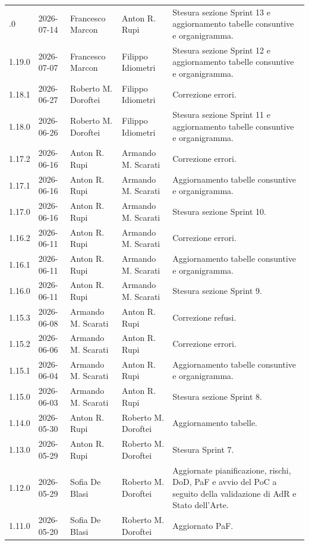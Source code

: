 \begin{longtable}{>{\ttfamily\small}l l l l >{\raggedright\arraybackslash}p{4cm}}
    \bottomrule
    \endlastfoot
    1.20.0 & 2026-07-14 & Francesco Marcon & Anton R. Rupi & Stesura sezione Sprint 13 e aggiornamento tabelle consuntive e organigramma. \\
    1.19.0 & 2026-07-07 & Francesco Marcon & Filippo Idiometri & Stesura sezione Sprint 12 e aggiornamento tabelle consuntive e organigramma. \\
    1.18.1 & 2026-06-27 & Roberto M. Doroftei & Filippo Idiometri  & Correzione errori. \\
    1.18.0 & 2026-06-26 & Roberto M. Doroftei & Filippo Idiometri  & Stesura sezione Sprint 11 e aggiornamento tabelle consuntive e organigramma. \\
    1.17.2 & 2026-06-16 & Anton R. Rupi & Armando M. Scarati & Correzione errori. \\
    1.17.1 & 2026-06-16 & Anton R. Rupi & Armando M. Scarati & Aggiornamento tabelle consuntive e organigramma. \\
    1.17.0 & 2026-06-16 & Anton R. Rupi & Armando M. Scarati  & Stesura sezione Sprint 10. \\
    1.16.2 & 2026-06-11 & Anton R. Rupi & Armando M. Scarati & Correzione errori. \\
    1.16.1 & 2026-06-11 & Anton R. Rupi & Armando M. Scarati & Aggiornamento tabelle consuntive e organigramma. \\
    1.16.0 & 2026-06-11 & Anton R. Rupi & Armando M. Scarati  & Stesura sezione Sprint 9. \\
    1.15.3 & 2026-06-08 & Armando M. Scarati & Anton R. Rupi & Correzione refusi. \\
    1.15.2 & 2026-06-06 & Armando M. Scarati & Anton R. Rupi & Correzione errori. \\
    1.15.1 & 2026-06-04 & Armando M. Scarati & Anton R. Rupi & Aggiornamento tabelle consuntive e organigramma. \\
    1.15.0 & 2026-06-03 & Armando M. Scarati & Anton R. Rupi & Stesura sezione Sprint 8. \\
    1.14.0 & 2026-05-30 & Anton R. Rupi & Roberto M. Doroftei & Aggiornamento tabelle. \\
    1.13.0 & 2026-05-29 & Anton R. Rupi & Roberto M. Doroftei & Stesura Sprint 7. \\
    1.12.0 & 2026-05-29 & Sofia De Blasi & Roberto M. Doroftei & Aggiornate pianificazione, rischi, DoD, PaF e avvio del PoC a seguito della validazione di AdR e Stato dell'Arte. \\
	1.11.0 & 2026-05-20 & Sofia De Blasi & Roberto M. Doroftei & Aggiornato PaF. \\

\end{longtable}
